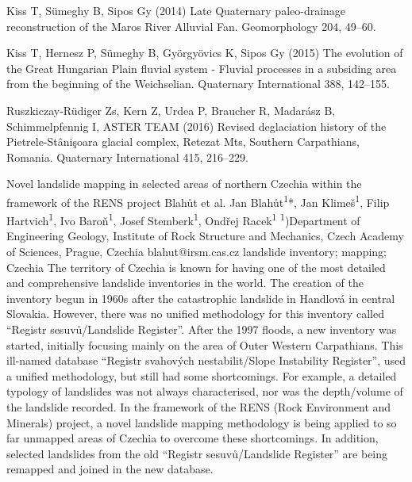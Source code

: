 {Kiss T, Sümeghy B, Sipos Gy (2014) Late Quaternary paleo-drainage reconstruction of the Maros River Alluvial Fan. Geomorphology 204, 49–60.
	
Kiss T, Hernesz P, Sümeghy B, Györgyövics K, Sipos Gy (2015) The evolution of the Great Hungarian Plain fluvial system - Fluvial processes in a subsiding area from the beginning of the Weichselian. Quaternary International 388, 142–155. 
	
Ruszkiczay-Rüdiger Zs, Kern Z, Urdea P, Braucher R, Madarász B, Schimmelpfennig I, ASTER TEAM (2016) Revised deglaciation history of the Pietrele-Stânişoara glacial complex, Retezat Mts, Southern Carpathians, Romania. Quaternary International 415, 216–229.
}%


\abstract
{Novel landslide mapping in selected areas of northern Czechia within the framework of the RENS project} 
{Blahůt et al.} 
{Jan Blahůt\textsuperscript{1}*, Jan Klimeš\textsuperscript{1}, Filip Hartvich\textsuperscript{1}, Ivo Baroň\textsuperscript{1}, Josef Stemberk\textsuperscript{1}, Ondřej Racek\textsuperscript{1}} 
{\POtag} 
{
\textsuperscript{1})Department of Engineering Geology, Institute of Rock Structure and Mechanics, Czech Academy of Sciences, Prague, Czechia
}
{blahut@irsm.cas.cz}  %
{landslide inventory; mapping; Czechia}
{The territory of Czechia is known for having one of the most detailed and comprehensive landslide inventories in the world. The creation of the inventory begun in 1960s after the catastrophic landslide in Handlová in central Slovakia. However, there was no unified methodology for this inventory called “Registr sesuvů/Landslide Register”. After the 1997 floods, a new inventory was started, initially focusing mainly on the area of Outer Western Carpathians. This ill-named database “Registr svahových nestabilit/Slope Instability Register”, used a unified methodology, but still had some shortcomings. For example, a detailed typology of landslides was not always characterised, nor was the depth/volume of the landslide recorded. In the framework of the RENS (Rock Environment and Minerals) project, a novel landslide mapping methodology is being applied to so far unmapped areas of Czechia to overcome these shortcomings. In addition, selected landslides from the old “Registr sesuvů/Landslide Register” are being remapped and joined in the new database. 
}
{
}


